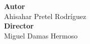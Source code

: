 \begin{titlepage}
\vspace{2.5cm}
\noindent\hspace*{\centeroffset}\begin{minipage}{\textwidth}
\centering

\textbf{Autor}\\ {Ahisahar Pretel Rodríguez}\\[2.5ex]
\textbf{Director}\\
{Miguel Damas Hermoso\\
}\\[2cm]
\end{minipage}


\end{titlepage}
